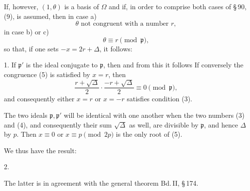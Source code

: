 If, however, $(1, \theta)$ is a basis of $\Omega$ and if, in order to comprise
both cases of §\,90, (9),
is assumed, then in case a)
\[
\theta \text{ not congruent with a number } r,
\]
in case b) or c)
\[
\theta \equiv r \pmod{\mathfrak{p}},
\]
so that, if one sets $-x = 2r + \Delta$, it follows:

1. 
If $\mathfrak{p}'$ is the ideal conjugate to $\mathfrak{p}$, then
and from this it follows
If conversely the congruence (5) is satisfied by $x = r$, then
\[
\frac{r+\sqrt{\Delta}}{2}\cdot\frac{-r+\sqrt{\Delta}}{2} \equiv 0 \pmod{\mathfrak{p}},
\]
and consequently either $x = r$ or $x = -r$ satisfies condition (3).

The two ideals $\mathfrak{p}, \mathfrak{p}'$ will be identical with one another
when the two numbers (3) and (4), and consequently their
sum $\sqrt{\Delta}$ as well, are divisible by $\mathfrak{p}$, and hence $\Delta$ by $p$. Then
$x \equiv 0$ or $x \equiv p \pmod{2p}$ is the only root of (5).

We thus have the result:

2. 

The latter is in agreement with the general
theorem Bd.\,II, §\,174.
